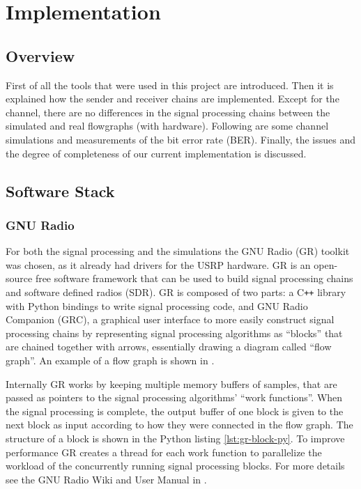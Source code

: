 
\chapter{Implementation}

\section{Overview}

First of all the tools that were used in this project are introduced. Then it is explained how the sender and receiver chains are implemented. Except for the channel, there are no differences in the signal processing chains between the simulated and real flowgraphs (with hardware). Following are some channel simulations and measurements of the bit error rate (BER). Finally, the issues and the degree of completeness of our current implementation is discussed.

\section{Software Stack}

\subsection{GNU Radio}

For both the signal processing and the simulations the GNU Radio (GR) toolkit was chosen, as it already had drivers for the USRP hardware. GR is an open-source free software framework that can be used to build signal processing chains and software defined radios (SDR). GR is composed of two parts: a C\texttt{++} library with Python bindings to write signal processing code, and GNU Radio Companion (GRC), a graphical user interface to more easily construct signal processing chains by representing signal processing algorithms as ``blocks'' that are chained together with arrows, essentially drawing a diagram called ``flow graph''. An example of a flow graph is shown in .

Internally GR works by keeping multiple memory buffers of samples, that are passed as pointers to the signal processing algorithms' ``work functions''. When the signal processing is complete, the output buffer of one block is given to the next block as input according to how they were connected in the flow graph. The structure of a block is shown in the Python listing \ref{lst:gr-block-py}. To improve performance GR creates a thread for each work function to parallelize the workload of the concurrently running signal processing blocks. For more details see the GNU Radio Wiki and User Manual in \cite{GRWiki}.

